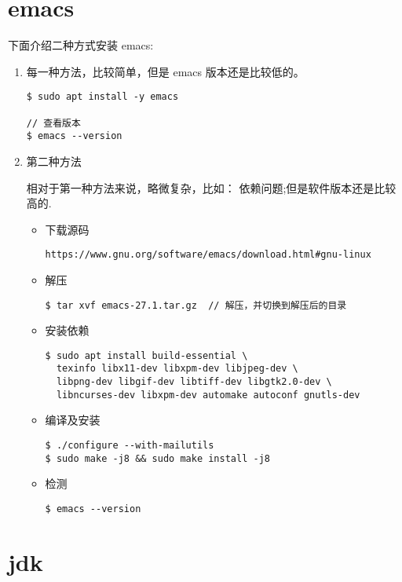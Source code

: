 \section{emacs}
下面介绍二种方式安装 emacs:
\flushleft
\begin{enumerate}
\item 每一种方法，比较简单，但是 emacs 版本还是比较低的。
\begin{lstlisting}
$ sudo apt install -y emacs 

// 查看版本
$ emacs --version  
\end{lstlisting}

\item 第二种方法

相对于第一种方法来说，略微复杂，比如： 依赖问题;但是软件版本还是比较高的.

\begin{itemize}
\item 下载源码 

\begin{lstlisting}
https://www.gnu.org/software/emacs/download.html#gnu-linux
\end{lstlisting}

\item 解压
\begin{lstlisting}
$ tar xvf emacs-27.1.tar.gz  // 解压，并切换到解压后的目录
\end{lstlisting}

\item 安装依赖
\begin{lstlisting}
$ sudo apt install build-essential \
  texinfo libx11-dev libxpm-dev libjpeg-dev \
  libpng-dev libgif-dev libtiff-dev libgtk2.0-dev \
  libncurses-dev libxpm-dev automake autoconf gnutls-dev
\end{lstlisting}

\item 编译及安装
\begin{lstlisting}
$ ./configure --with-mailutils 
$ sudo make -j8 && sudo make install -j8
\end{lstlisting}

\item 检测
\begin{lstlisting}
$ emacs --version
\end{lstlisting}

\end{itemize}
\end{enumerate}
\newpage

\section{jdk}

